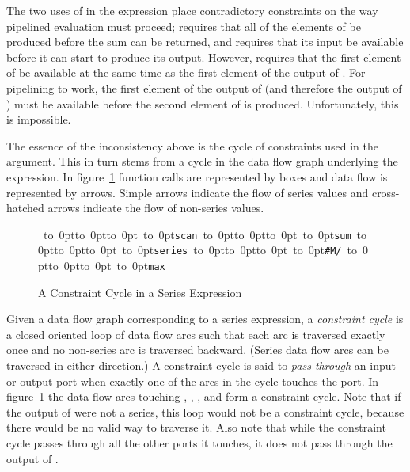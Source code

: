 The two uses of  in the expression place contradictory
constraints on the way pipelined evaluation must proceed;  
requires that all of the elements of  be produced before the sum can
be returned, and  requires that its input be available before it
can start to produce its output.  However,  requires that the
first element of  be available at the same time as the first element
of the output of .  For pipelining to work,
the first element of the output of  (and therefore the output
of ) must be available before the second element of 
 is produced.  Unfortunately, this is impossible.

The essence of the inconsistency above is the cycle of constraints used in
the argument.  This in turn stems from a cycle in the data flow graph
underlying the expression.  In
figure~\ref{SERIES-F1-FIGURE} function calls are represented by boxes and data
flow is represented by arrows.  Simple arrows indicate the flow of series
values and cross-hatched arrows indicate the flow of non-series values.

\begin{figure}[t]
\caption{A Constraint Cycle in a Series Expression}\label{SERIES-F1-FIGURE}
\vskip 5pc
\relax
\hbox{\relax
\def\foo#1#2#3{\vbox to 0pt{\vskip #2\vskip 3pt\hbox to 0pt{\hskip #1\hskip -3pt\vbox to 0pt{\vss
   \hbox to 0pt{\hss \tt #3\hss}\vss}\hss}\vss}}
\foo{2.5pc}{-3.5pc}{scan}\relax
\foo{8.5pc}{-2.5pc}{sum}\relax
\foo{14pc}{-2.5pc}{series}\relax
\foo{19.5pc}{-3.5pc}{\#M/}\relax
\foo{25pc}{-3.5pc}{max}}
\end{figure}

Given a data flow graph corresponding to a series expression, a {\it
constraint cycle} is a closed oriented loop of data flow arcs such
that each arc is traversed exactly once and no non-series arc
is traversed backward.  (Series data flow arcs can be traversed in either
direction.)  A constraint cycle is said to {\it pass through} an input or
output port when exactly one of the arcs in the cycle touches the port.  In
figure~\ref{SERIES-F1-FIGURE} the data flow arcs touching , ,
, and  form a constraint cycle.  Note that if the
output of  were not a series, this loop would not be a constraint
cycle, because there would be no valid way to traverse it.  Also note that
while the constraint cycle passes through all the other ports it touches,
it does not pass through the output of .

